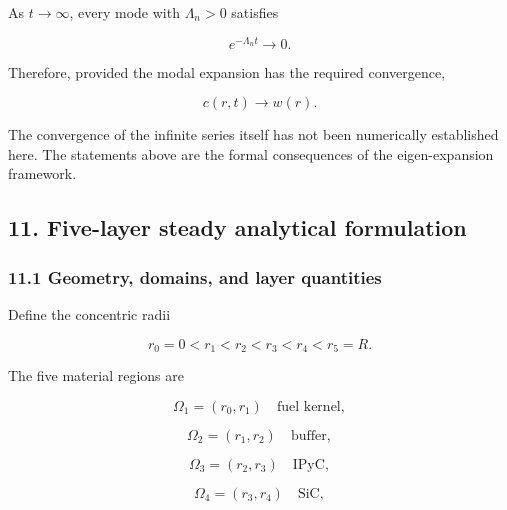 \documentclass[11pt,a4paper]{article}
\begin{document}
As $t\to\infty$, every mode with $\Lambda_n>0$ satisfies

\begin{equation}
e^{-\Lambda_nt}\to0.
\tag{TRISO-SL-241}
\label{eq:triso-sl-241}
\end{equation}

Therefore, provided the modal expansion has the required convergence,

\begin{equation}
\boxed{
c(r,t)\to w(r).
}
\tag{TRISO-SL-242}
\label{eq:triso-sl-242}
\end{equation}

The convergence of the infinite series itself has not been numerically established here. The statements above are the formal consequences of the eigen-expansion framework.

\subsection*{11. Five-layer steady analytical formulation}

\subsubsection*{11.1 Geometry, domains, and layer quantities}

Define the concentric radii

\begin{equation}
r_0=0<r_1<r_2<r_3<r_4<r_5=R.
\tag{TRISO-ML-300}
\label{eq:triso-ml-300}
\end{equation}

The five material regions are

\begin{equation}
\Omega_1=(r_0,r_1)
\quad\text{fuel kernel},
\tag{TRISO-ML-301}
\label{eq:triso-ml-301}
\end{equation}

\begin{equation}
\Omega_2=(r_1,r_2)
\quad\text{buffer},
\tag{TRISO-ML-302}
\label{eq:triso-ml-302}
\end{equation}

\begin{equation}
\Omega_3=(r_2,r_3)
\quad\text{IPyC},
\tag{TRISO-ML-303}
\label{eq:triso-ml-303}
\end{equation}

\begin{equation}
\Omega_4=(r_3,r_4)
\quad\text{SiC},
\tag{TRISO-ML-304}
\label{eq:triso-ml-304}
\end{equation}
\end{document}
